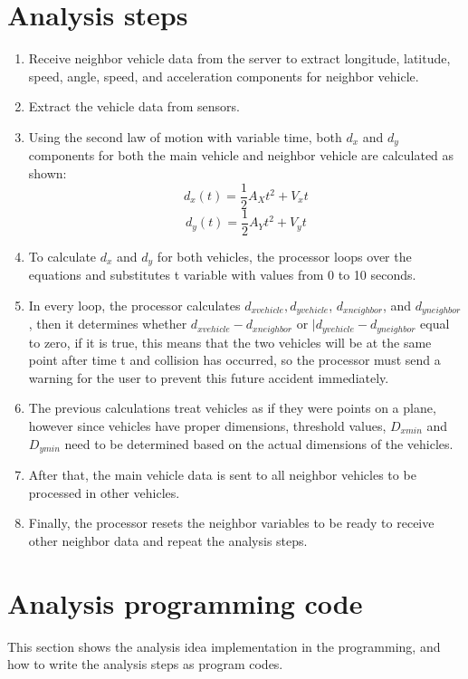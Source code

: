 \section{Analysis steps}
\begin{enumerate}
    \item Receive neighbor vehicle data from the server to extract longitude, latitude, speed, angle, speed, and acceleration components for neighbor vehicle.
    \item Extract the vehicle data from sensors.
    \item Using the second law of motion with variable time, both $d_x$ and $d_y$ components for both the main vehicle and neighbor vehicle are calculated as shown:
    \[d_x(t) = \frac{1}{2}A_X t^2 + V_x t\]
    \[d_y(t) = \frac{1}{2}A_Y t^2 + V_y t\]
    \item To calculate $d_x$ and $d_y$ for both vehicles, the processor loops over the equations and substitutes t variable with values from 0 to 10 seconds.
    \item In every loop, the processor calculates  \(d_{xvehicle},    d_{yvehicle}\), $d_{xneighbor}$, and $d_{yneighbor}$, then it determines whether $d_{xvehicle} - d_{xneighbor}$ or \(|d_{yvehicle} - d_{yneighbor}\)
equal to zero, if it is true, this means that the two vehicles will be at the same point after time t and collision has occurred, so the processor must send a warning for the user to prevent this future accident immediately.
    \item The previous calculations treat vehicles as if they were points on a plane, however since vehicles have proper dimensions, threshold values, $D_{xmin}$ and $D_{ymin}$  need to be determined based on the actual dimensions of the vehicles.
    \item After that, the main vehicle data is sent to all neighbor vehicles to be processed in other vehicles.
    \item Finally, the processor resets the neighbor variables to be ready to receive other neighbor data and repeat the analysis steps.
\end{enumerate}

\section{Analysis programming code}
This section shows the analysis idea implementation in the programming, and how to write the analysis steps as program codes.

